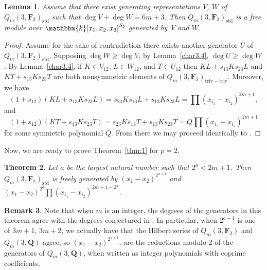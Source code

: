\documentclass[pdftex]{sigma}
\newtheorem{Theorem}{Theorem}[section]
\newtheorem{Lemma}[Theorem]{Lemma}
\theoremstyle{definition}
\newtheorem{Remark}[Theorem]{Remark}
\numberwithin{equation}{section}
\renewcommand{\k}{\mathbbm{k}}
\newcommand{\F}{\mathbf{F}}
\newcommand{\std}{\mathrm{std}}
\newcommand{\trtr}{\mathrm{triv-triv}}
\begin{document}
\begin{Lemma}\label{charFree}
 Assume that there exist generating representations $V$, $W$ of $Q_m(3,\mathbf{F}_2)_\std$ such that $\deg V+\deg W=6m+3$. Then $Q_m(3,\mathbf{F}_2)_\std$ is a free module over $\k[x_1,x_2,x_3]^{S_3}$ generated by~$V$ and $W$.
\end{Lemma}
\begin{proof}
 Assume for the sake of contradiction there exists another generator $U$ of $Q_m(3,\mathbf{F}_2)_{\std}$. Supposing $\deg W\geq \deg V$, by Lemma~\ref{char3.4}, $\deg U\geq \deg W$. By Lemma~\ref{char3.4}, if $K\in V_{12}$, $L\in W_{12}$, and $T\in U_{12}$ then $KL+s_{13}Ks_{23}L$ and $KT+s_{13}Ks_{23}T$ are both nonsymmetric elements of $Q_m(3,\mathbf{F}_2)_{\trtr}$. Moreover, we have
 \[(1+s_{12})(KL+s_{13}Ks_{23}L) = s_{23}Ks_{13}L+s_{13}Ks_{23}L = \prod (x_{i_1}-x_{i_2})^{2m+1},\]
 and
 \[(1+s_{12})(KT+s_{13}Ks_{23}T) = s_{23}Ks_{13}T+s_{13}Ks_{23}T = Q\prod (x_{i_1}-x_{i_2})^{2m+1}\]
 for some symmetric polynomial $Q$. From there we may proceed identically to \cite{wang2022explicit}.
\end{proof}

Now, we are ready to prove Theorem~\ref{thm:1} for $p=2$.

\begin{Theorem}\label{thm:p2}
 Let $a$ be the largest natural number such that $2^a< 2m+1$. Then $Q_m(3,\mathbf{F}_2)_{\std}$ is freely generated by $(x_1-x_2)^{2^{a+1}}$ and $(x_1-x_2)^{2^a}\prod (x_{i_1}-x_{i_2})^{2m+1-2^a}$.
\end{Theorem}

\begin{Remark}
 Note that when $m$ is an integer, the degrees of the generators in this theorem agree with the degrees conjectured in \cite{Ren_2020}. In particular, when $2^{a+1}$ is one of $3m+1$, ${3m+2}$, we actually have that the Hilbert series of $Q_m(3,\F_2)$ and $Q_m(3,\mathbf{Q})$ agree, so $(x_1-x_2)^{2^{a+1}}$,  are the reductions modulo 2 of the generators of $Q_m(3,\mathbf{Q})$, when written as integer polynomials with coprime coefficients.
\end{Remark}
\end{document}
